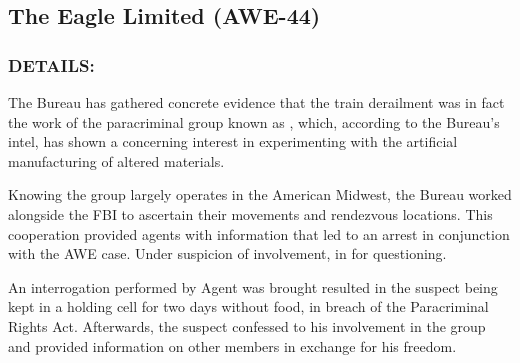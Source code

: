 \subsection*{The Eagle Limited (AWE-44)}
\subsubsection*{DETAILS:}
\par The Bureau has gathered concrete evidence that the train
derailment was in fact the work of the paracriminal group known
as 
, which, according to the Bureau's intel, has
shown a concerning interest in experimenting with the artificial
manufacturing of altered materials.
\par Knowing the group largely operates in the American Midwest, the
Bureau worked alongside the FBI to ascertain their movements
and rendezvous locations. This cooperation provided agents with
information that led to an arrest in conjunction with the AWE
case. Under suspicion of involvement, 
in for questioning.
\par An interrogation performed by Agent 
was brought resulted in the suspect being kept in a holding cell for two days without food, in
breach of the Paracriminal Rights Act. Afterwards, the suspect
confessed to his involvement in the  group and provided information on other members in exchange for his
freedom.